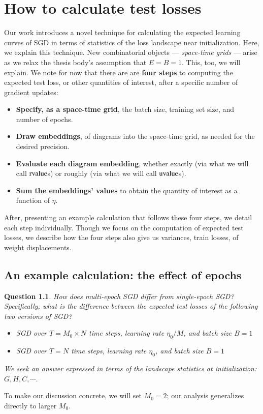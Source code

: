 \documentclass[openany, notitlepage, justified]{tufte-book}
\theoremstyle{plain}
\newtheorem{quest}{Question}
\theoremstyle{definition}
\newcommand{\uvalue}{\text{\textnormal{uvalue}}}
\newcommand{\rvalue}{\text{\textnormal{rvalue}}}
\begin{document}
\chapter{How to calculate test losses}                   \label{appendix:tutorial}
    Our work introduces a novel technique for calculating the expected learning
    curves of SGD in terms of statistics of the loss landscape near
    initialization.  Here, we explain this technique.  New combinatorial
    objects --- \emph{space-time grids} --- arise as we relax the thesis body's
    assumption that $E=B=1$.  This, too, we will explain.  We note for now that
    there are are {\bf four steps} to computing the expected test loss, or
    other quantities of interest, after a specific number of gradient updates: 
    \begin{itemize}
        \item {\bf Specify, as a space-time grid}, the batch size, training set
            size, and number of epochs. 
        \item {\bf Draw embeddings}, of diagrams into the
            space-time grid, as needed for the desired precision.
        \item {\bf Evaluate each diagram embedding}, whether exactly (via what
            we will call $\rvalue$s) or roughly (via what we will call
            $\uvalue$s).
        \item {\bf Sum the embeddings' values} to obtain the quantity of
              interest as a function of $\eta$.
    \end{itemize}

    After, presenting an example calculation that follows these four steps,
    we detail each step individually.  Though we focus on the computation of
    expected test losses, we describe how the four steps also give us
    variances, train losses, of weight displacements.  

    \section{An example calculation: the effect of epochs}       %

        \begin{quest}\label{qst:multi}
            How does multi-epoch SGD differ from single-epoch SGD?
            Specifically, what is the difference between the expected
            test losses of the following two versions of SGD?
            \begin{itemize}
                \item SGD over $T=M_0 \times N$ time steps, learning rate $\eta_0/M$, and
                    batch size $B=1$
                \item SGD over $T=N$ time steps, learning rate $\eta_0$, and batch size $B=1$
            \end{itemize}
            We seek an answer expressed in terms of the landscape statistics
            at initialization: $G,H,C, \cdots$.
        \end{quest}
        To make our discussion concrete, we will set $M_0=2$; our analysis 
        generalizes directly to larger $M_0$.
\end{document}
